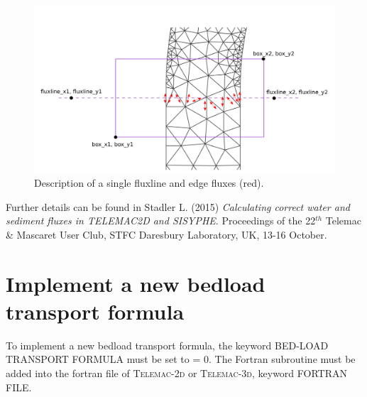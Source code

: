 \begin{figure}[H]
\begin{center}
\includegraphics[scale=0.25,angle=0]{graphics/fluxline_example.png}
\caption{Description of a single fluxline and edge fluxes (red).}\label{fig:fluxline_example}
\end{center}
\end{figure}

Further details can be found in Stadler L. (2015) \textit{Calculating correct water and sediment fluxes in TELEMAC2D and SISYPHE}. Proceedings of the 22$^{th}$
Telemac \& Mascaret User Club, STFC Daresbury Laboratory, UK, 13-16 October.

\section{Implement a new bedload transport formula}
To implement a new bedload transport formula, the keyword {\ttfamily BED-LOAD TRANSPORT FORMULA} must be set to {\ttfamily = 0}. The Fortran subroutine must be added into the fortran file of \textsc{Telemac-2d} or \textsc{Telemac-3d}, keyword {\ttfamily FORTRAN FILE}.

